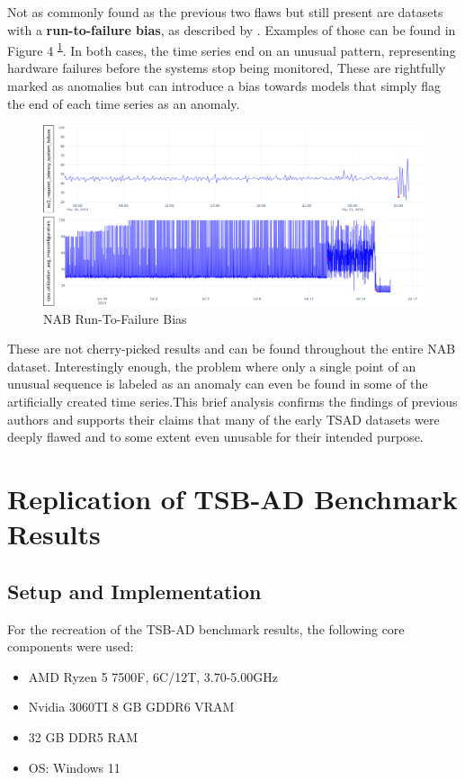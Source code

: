 \documentclass[12pt,oneside]{article}
\newcommand{\supref}[1]{\textsuperscript{\footnotesize{\ref{#1}}}}
\begin{document}
Not as commonly found as the previous two flaws but still present are datasets with a \textbf{run-to-failure bias}, as described by \cite{wu2021current}. Examples of those can be found in Figure 4 \supref{fig:run_to_failure}. In both cases, the time series end on an unusual pattern, representing hardware failures before the systems stop being monitored, These are rightfully marked as anomalies but can introduce a bias towards models that simply flag the end of each time series as an anomaly.

\begin{figure}[htbp] 
    \centering 
    \includegraphics[width=\textwidth]{run_to_failure.png}
    \caption{NAB Run-To-Failure Bias}
    \label{fig:run_to_failure}
\end{figure}

These are not cherry-picked results and can be found throughout the entire NAB dataset. Interestingly enough, the problem where only a single point of an unusual sequence is labeled as an anomaly can even be found in some of the artificially created time series.This brief analysis confirms the findings of previous authors and supports their claims that many of the early TSAD datasets were deeply flawed and to some extent even unusable for their intended purpose.


\section{Replication of TSB-AD Benchmark Results}

\subsection{Setup and Implementation}
For the recreation of the TSB-AD benchmark results, the following core components were used:
\begin{itemize}
    \item AMD Ryzen 5 7500F, 6C/12T, 3.70-5.00GHz
    \item Nvidia 3060TI 8 GB GDDR6 VRAM
    \item 32 GB DDR5 RAM
    \item OS: Windows 11
\end{itemize}
\end{document}
